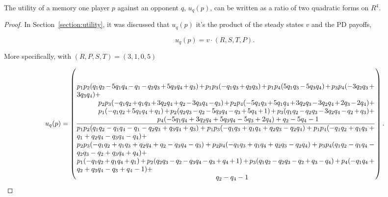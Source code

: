 The utility of a memory one player \(p\) against an opponent \(q\),
\(u_q(p)\), can be written as a ratio of two quadratic forms on \(R^4\).

\begin{proof}

In Section~\ref{section:utility}, it was discussed that \(u_q(p)\) it's the product
of the steady states \(v\) and the PD payoffs,

\[u_q(p) = v \cdot (R, S, T, P).\]

More specifically, with \((R, P, S, T) = (3, 1, 0, 5)\)

\begingroup
\footnotesize
\begin{equation}
    u_q(p) =
    \left(
      \frac
        {\parbox{6in}{$
            p_{1} p_{2} (q_{1} q_{2} - 5 q_{1} q_{4} - q_{1} - q_{2} q_{3} + 5 q_{3} q_{4} + q_{3}) + p_{1} p_{3} (- q_{1} q_{3} + q_{2} q_{3}) + p_{1} p_{4} (5 q_{1} q_{3} - 5 q_{3} q_{4}) + p_{3} p_{4} (- 3 q_{2} q_{3} + 3 q_{3} q_{4}) +$ \\
            \hspace*{1cm} $ p_{2} p_{3} (- q_{1} q_{2} + q_{1} q_{3} + 3 q_{2} q_{4} + q_{2} - 3 q_{3} q_{4} - q_{3}) + p_{2} p_{4} (- 5 q_{1} q_{3} + 5 q_{1} q_{4} + 3 q_{2} q_{3} - 3 q_{2} q_{4} + 2 q_{3} - 2 q_{4}) + $ \\
            \hspace*{1cm} $ p_{1} (- q_{1} q_{2} + 5 q_{1} q_{4} + q_{1}) + p_{2} (q_{2} q_{3} - q_{2} - 5 q_{3} q_{4} - q_{3} + 5 q_{4} + 1) + p_{3} (q_{1} q_{2} - q_{2} q_{3} - 3 q_{2} q_{4} - q_{2} + q_{3}) +$ \\
            \hspace*{4cm} $ p_{4} (- 5 q_{1} q_{4} + 3 q_{2} q_{4} + 5 q_{3} q_{4} - 5 q_{3} + 2 q_{4}) + q_{2} - 5 q_{4} - 1$
        }}
        {\parbox{6in}{$
        p_{1} p_{2} (q_{1} q_{2} - q_{1} q_{4} - q_{1} - q_{2} q_{3} + q_{3} q_{4} + q_{3}) + p_{1} p_{3} (- q_{1} q_{3} + q_{1} q_{4} + q_{2} q_{3} - q_{2} q_{4}) + p_{1} p_{4} (- q_{1} q_{2} + q_{1} q_{3} + q_{1} + q_{2} q_{4} - q_{3} q_{4} - q_{4}) +$ \\
        $ p_{2} p_{3} (- q_{1} q_{2} + q_{1} q_{3} + q_{2} q_{4} + q_{2} - q_{3} q_{4} - q_{3}) + p_{2} p_{4} (- q_{1} q_{3} + q_{1} q_{4} + q_{2} q_{3} - q_{2} q_{4}) + p_{3} p_{4} (q_{1} q_{2} - q_{1} q_{4} - q_{2} q_{3} - q_{2} + q_{3} q_{4} + q_{4}) + $ \\
        $ p_{1} (- q_{1} q_{2} + q_{1} q_{4} + q_{1}) + p_{2} (q_{2} q_{3} - q_{2} - q_{3} q_{4} - q_{3} + q_{4} + 1) + p_{3} (q_{1} q_{2} - q_{2} q_{3} - q_{2} + q_{3} - q_{4}) + p_{4} (- q_{1} q_{4} + q_{2} + q_{3} q_{4} - q_{3} + q_{4} - 1) + $ \\
        \hspace*{7cm} $q_{2} - q_{4} - 1$
      }}
    \right).
\end{equation}
\endgroup


\end{proof}
